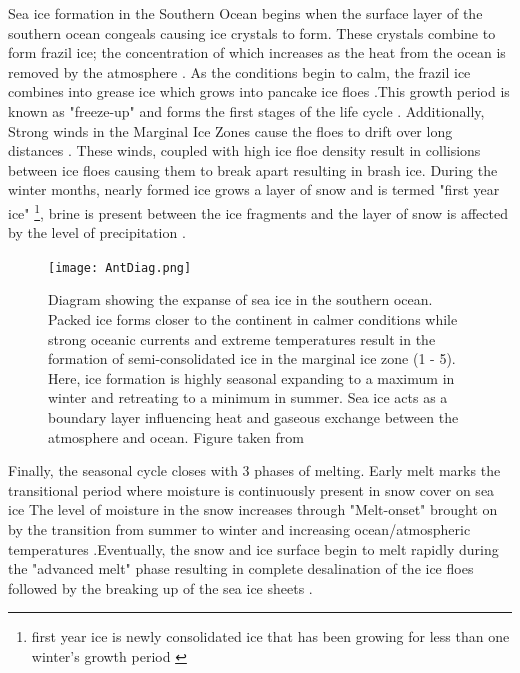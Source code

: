 Sea ice formation in the Southern Ocean begins when the surface layer of the southern ocean congeals causing ice crystals to form. These crystals combine to form frazil ice; the concentration of which increases as the heat from the ocean is removed by the atmosphere \cite{arrigo2004large}. As the conditions begin to calm, the frazil ice combines into grease ice which grows into pancake ice floes \cite{arrigo2004large}.This growth period is known as "freeze-up" and forms the first stages of the life cycle \cite{barber2005microwave}. Additionally, Strong winds in the Marginal Ice Zones cause the floes to drift over long distances \cite{alberello2019drift}. These winds, coupled with high ice floe density result in collisions between ice floes causing them to break apart \cite{STEER2008933} resulting in brash ice\cite{icedefinition1992}.  During the winter months, nearly formed ice grows a layer of snow \cite{barber2005microwave} and is termed "first year ice" \footnote{first year ice is newly consolidated ice that has been growing for less than one winter's growth period \cite{icedefinition1992}}, brine is present between the ice fragments and the layer of snow is affected by the level of precipitation \cite{barber2005microwave}.\par

\begin{figure}[H]
    \centering
    \texttt{[image: AntDiag.png]}
    \caption{Diagram showing the expanse of sea ice in the southern ocean. Packed ice forms closer to the continent in calmer conditions while strong oceanic currents and extreme temperatures result in the formation of semi-consolidated ice in the marginal ice zone (1 - 5). Here, ice formation is highly seasonal expanding to a maximum in winter and retreating to a minimum in summer. Sea ice acts as a boundary layer influencing heat and gaseous  exchange between the atmosphere and ocean. Figure taken from \cite{Antseaice}}
    \label{fig:AntaDiag}
\end{figure}



Finally, the seasonal cycle closes with 3 phases of melting. Early melt marks the transitional period  where moisture is continuously present in snow cover on sea ice \cite{barber2005microwave} The level of moisture in the snow increases through "Melt-onset" brought on by the transition from summer to winter and increasing ocean/atmospheric temperatures \cite{barber2005microwave}.Eventually, the snow and ice surface begin to melt rapidly during the "advanced melt" phase resulting in complete desalination of the ice floes followed by the breaking up of the sea ice sheets \cite{barber2005microwave}. 

